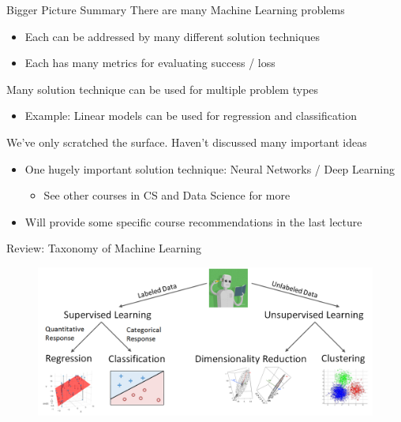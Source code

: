 \documentclass[aspectratio=169]{../latex_main/tntbeamer}  %
\begin{document}
	
	
	\begin{frame}{Bigger Picture Summary}
	    There are many Machine Learning problems
	    \begin{itemize}
	        \item Each can be addressed by many different solution techniques
	        \item Each has many metrics for evaluating success / loss
	    \end{itemize}
	    \bigskip
	    Many solution technique can be used for multiple problem types
	    \begin{itemize}
	        \item Example: Linear models can be used for regression and classification
	    \end{itemize}
	    \bigskip
	    We’ve only scratched the surface. Haven’t discussed many important ideas
        \begin{itemize}
            \item One hugely important solution technique: Neural Networks / Deep Learning
            \begin{itemize}
                \item See other courses in CS and Data Science for more
            \end{itemize}
            \item Will provide some specific course recommendations in the last lecture
        \end{itemize}
	\end{frame}
	
	
	
	\begin{frame}{Review: Taxonomy of Machine Learning}
	    \begin{figure}
	        \centering
	        \includegraphics[scale=.4]{Bild60}
	    \end{figure}
	\end{frame}
\end{document}
